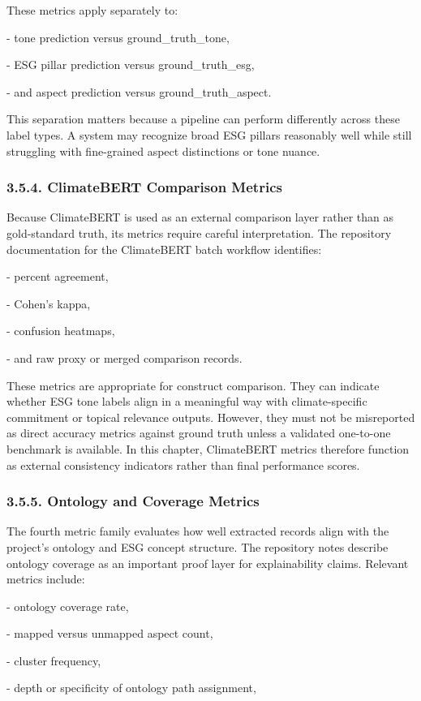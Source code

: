 \documentclass{article}
\begin{document}
These metrics apply separately to:

- tone prediction versus ground\_truth\_tone,

- ESG pillar prediction versus ground\_truth\_esg,

- and aspect prediction versus ground\_truth\_aspect.

This separation matters because a pipeline can perform differently across these label types. A system may recognize broad ESG pillars reasonably well while still struggling with fine-grained aspect distinctions or tone nuance.
\subsubsection*{ 3.5.4. ClimateBERT Comparison Metrics}

Because ClimateBERT is used as an external comparison layer rather than as gold-standard truth, its metrics require careful interpretation. The repository documentation for the ClimateBERT batch workflow identifies:

- percent agreement,

- Cohen’s kappa,

- confusion heatmaps,

- and raw proxy or merged comparison records.

These metrics are appropriate for construct comparison. They can indicate whether ESG tone labels align in a meaningful way with climate-specific commitment or topical relevance outputs. However, they must not be misreported as direct accuracy metrics against ground truth unless a validated one-to-one benchmark is available. In this chapter, ClimateBERT metrics therefore function as external consistency indicators rather than final performance scores.
\subsubsection*{ 3.5.5. Ontology and Coverage Metrics}

The fourth metric family evaluates how well extracted records align with the project’s ontology and ESG concept structure. The repository notes describe ontology coverage as an important proof layer for explainability claims. Relevant metrics include:

- ontology coverage rate,

- mapped versus unmapped aspect count,

- cluster frequency,

- depth or specificity of ontology path assignment,
\end{document}
